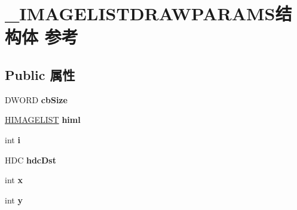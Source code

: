 \hypertarget{struct___i_m_a_g_e_l_i_s_t_d_r_a_w_p_a_r_a_m_s}{}\section{\+\_\+\+I\+M\+A\+G\+E\+L\+I\+S\+T\+D\+R\+A\+W\+P\+A\+R\+A\+M\+S结构体 参考}
\label{struct___i_m_a_g_e_l_i_s_t_d_r_a_w_p_a_r_a_m_s}
\subsection*{Public 属性}
\begin{DoxyCompactItemize}
\item 
\mbox{\label{struct___i_m_a_g_e_l_i_s_t_d_r_a_w_p_a_r_a_m_s_a300bb172f9c9164d092f4a987cf5573b}} 
D\+W\+O\+RD {\bfseries cb\+Size}
\item 
\mbox{\label{struct___i_m_a_g_e_l_i_s_t_d_r_a_w_p_a_r_a_m_s_a6937af658afb3a369ec78bb0a4b1276c}} 
\hyperlink{struct___i_m_a_g_e_l_i_s_t}{H\+I\+M\+A\+G\+E\+L\+I\+ST} {\bfseries himl}
\item 
\mbox{\label{struct___i_m_a_g_e_l_i_s_t_d_r_a_w_p_a_r_a_m_s_a3405c5e955cd461875b3f770e2f7756a}} 
int {\bfseries i}
\item 
\mbox{\label{struct___i_m_a_g_e_l_i_s_t_d_r_a_w_p_a_r_a_m_s_ac9f5b0d85f3402e74b97a90780ec5971}} 
H\+DC {\bfseries hdc\+Dst}
\item 
\mbox{\label{struct___i_m_a_g_e_l_i_s_t_d_r_a_w_p_a_r_a_m_s_a0f73e13d749b82c6c0059054379848d2}} 
int {\bfseries x}
\item 
\mbox{\label{struct___i_m_a_g_e_l_i_s_t_d_r_a_w_p_a_r_a_m_s_ab3f32ec4df34372ede9d467d383f4ec2}} 
int {\bfseries y}
\item 
\mbox{\label{struct___i_m_a_g_e_l_i_s_t_d_r_a_w_p_a_r_a_m_s_a8bc12a0e666e7037851ce6c18cd71ef9}} 

\end{DoxyCompactItemize}
